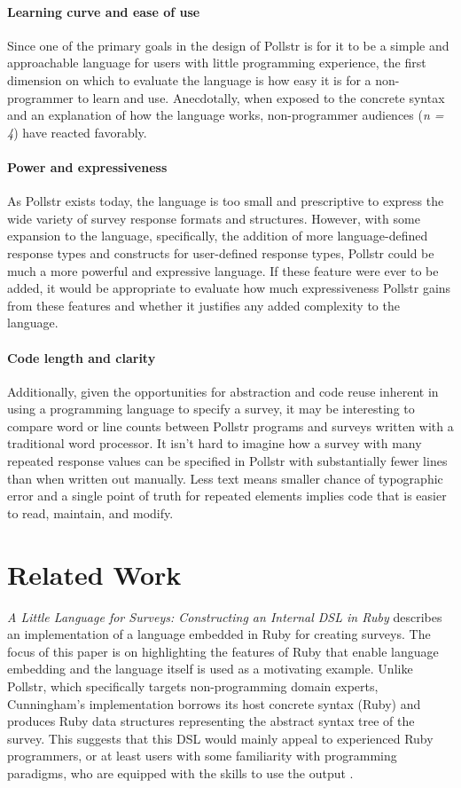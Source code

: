 \documentclass[pldi]{sigplanconf-pldi15}
\begin{document}
\paragraph{Learning curve and ease of use} Since one of the primary goals in 
the design of Pollstr is for it to be a simple and approachable language for 
users with little programming experience, the first dimension on which to evaluate 
the language is how easy it is for a non-programmer to learn and use. Anecdotally, 
when exposed to the concrete syntax and an explanation of how the language works,
non-programmer audiences (\textit{n = 4}) have reacted favorably.

\paragraph{Power and expressiveness}
As Pollstr exists today, the language is too small and prescriptive to express
the wide variety of survey response formats and structures. However, with some
expansion to the language, specifically, the addition of more language-defined
response types and constructs for user-defined response types, Pollstr could be
much a more powerful and expressive language.  If these feature were ever to
be added, it would be appropriate to evaluate how much expressiveness Pollstr 
gains from these features and whether it justifies any added complexity to the 
language.

\paragraph{Code length and clarity}
Additionally, given the opportunities for abstraction and code reuse inherent in
using a programming language to specify a survey, it may be interesting to 
compare word or line counts between Pollstr programs and surveys written
with a traditional word processor. It isn't hard to imagine how a survey with 
many repeated response values can be specified in Pollstr with substantially 
fewer lines than when written out manually.
Less text means smaller chance of typographic error and a single point of truth
for repeated elements implies code that is easier to read, maintain, and 
modify.

\section{Related Work}\label{sec:related}
\textit{A Little Language for Surveys: Constructing an Internal DSL in Ruby} describes
an implementation of a language embedded in Ruby for creating surveys. The focus of
this paper is on highlighting the features of Ruby that enable language embedding
and the language itself is used as a motivating example. Unlike Pollstr,
which specifically targets non-programming domain experts, Cunningham's 
implementation borrows its host concrete syntax (Ruby) and produces 
Ruby data structures representing the abstract syntax tree of the survey. This
suggests that this DSL would mainly appeal to experienced Ruby programmers, 
or at least users with some familiarity with programming paradigms, who are 
equipped with the skills to use the output \cite{cunningham}.
\end{document}
